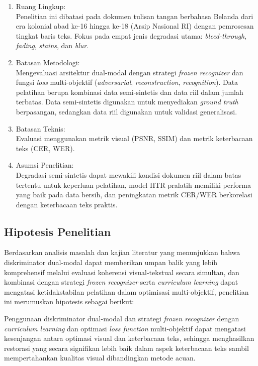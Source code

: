\begin{enumerate}[leftmargin=1.5em, labelsep=0.5em, itemindent=0pt, noitemsep, topsep=0pt]
      \item Ruang Lingkup: \\
            Penelitian ini dibatasi pada dokumen tulisan tangan berbahasa Belanda dari era kolonial abad ke-16 hingga ke-18 (Arsip Nasional RI) dengan pemrosesan tingkat baris teks. Fokus pada empat jenis degradasi utama: \textit{bleed-through}, \textit{fading}, \textit{stains}, dan \textit{blur}.
      \item Batasan Metodologi: \\
            Mengevaluasi arsitektur dual-modal dengan strategi \textit{frozen recognizer} dan fungsi \textit{loss} multi-objektif (\textit{adversarial}, \textit{reconstruction}, \textit{recognition}). Data pelatihan berupa kombinasi data semi-sintetis dan data riil dalam jumlah terbatas. Data semi-sintetis digunakan untuk menyediakan \textit{ground truth} berpasangan, sedangkan data riil digunakan untuk validasi generalisasi.
      \item Batasan Teknis: \\
            Evaluasi menggunakan metrik visual (PSNR, SSIM) dan metrik keterbacaan teks (CER, WER).
      \item Asumsi Penelitian: \\
            Degradasi semi-sintetis dapat mewakili kondisi dokumen riil dalam batas tertentu untuk keperluan pelatihan, model HTR pralatih memiliki performa yang baik pada data bersih, dan peningkatan metrik CER/WER berkorelasi dengan keterbacaan teks praktis.
\end{enumerate}

\subsection{Hipotesis Penelitian}
\label{subsec:hipotesis}

Berdasarkan analisis masalah dan kajian literatur yang menunjukkan bahwa diskriminator dual-modal dapat memberikan umpan balik yang lebih komprehensif melalui evaluasi koherensi visual-tekstual secara simultan, dan kombinasi dengan strategi \textit{frozen recognizer} serta \textit{curriculum learning} dapat mengatasi ketidakstabilan pelatihan dalam optimisasi multi-objektif, penelitian ini merumuskan hipotesis sebagai berikut:


Penggunaan diskriminator dual-modal dan strategi \textit{frozen recognizer} dengan \textit{curriculum learning} dan optimasi \textit{loss function} multi-objektif dapat mengatasi kesenjangan antara optimasi visual dan keterbacaan teks, sehingga menghasilkan restorasi yang secara signifikan lebih baik dalam aspek keterbacaan teks sambil mempertahankan kualitas visual dibandingkan metode acuan.


